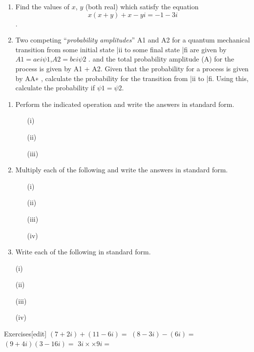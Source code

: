 \documentclass[12pt, a4paper]{report}
\theoremstyle{plain}
\theoremstyle{definition}
\theoremstyle{remark}
\begin{document}
\begin{enumerate}
\item Find the values of $x$, $y$ (both real) which satisfy the equation \[ x(x + y) + x − yi = −1 − 3i\].
\item Two competing “\textit{probability amplitudes}” A1 and A2 for a quantum mechanical transition from
some initial state |ii to some final state |fi are given by
$A1 = aei\psi1$,$ A2 = bei\psi2$
.
and the total probability amplitude (A) for the process is given by A1 + A2. Given that the probability
for a process is given by AA∗
, calculate the probability for the transition from |ii to |fi.
Using this, calculate the probability if $\psi1 = \psi2$.


\end{enumerate}


\begin{enumerate}

\item  Perform the indicated operation and write the answers in standard form.
\begin{itemize}
\item[(i)] 
\item[(ii)] 
\item[(iii)] 
\end{itemize}


\item   Multiply each of the following and write the answers in standard form.
\begin{itemize}
\item[(i)]    
\item[(ii)]    
\item[(iii)]    
\item[(iv)] 
\end{itemize}
   
\item  Write each of the following in standard form.
\item[(i)]    
\item[(ii)]    
\item[(iii)]    
\item[(iv)]    


\end{enumerate}


Exercises[edit]
$(7 + 2i) + (11 - 6i) =$
$(8 - 3i) - (6i) =$
$(9 + 4i)(3 - 16i) =$
$3i {\displaystyle \times } \times  9i =$
\end{document}
